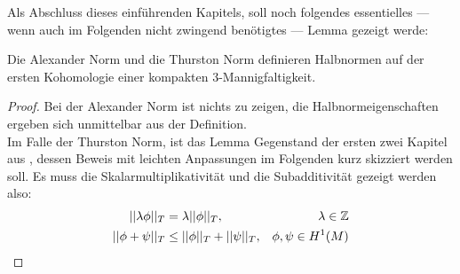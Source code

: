         Als Abschluss dieses einführenden Kapitels, soll noch folgendes essentielles --- wenn auch im Folgenden nicht zwingend benötigtes --- Lemma gezeigt werde:
        \begin{lem}
        \label{lem:norm}
        	Die Alexander Norm und die Thurston Norm definieren Halbnormen auf der ersten Kohomologie einer kompakten 3-Mannigfaltigkeit. 
        \end{lem}
        \begin{proof}
            Bei der Alexander Norm ist nichts zu zeigen, die Halbnormeigenschaften ergeben sich unmittelbar aus der Definition.\\
            Im Falle der Thurston Norm, ist das Lemma Gegenstand der ersten zwei Kapitel aus \cite{Thurston1986}, dessen Beweis mit leichten Anpassungen im Folgenden kurz skizziert werden soll.
            Es muss die Skalarmultiplikativität und die Subadditivität gezeigt werden also:
            \begin{align}
                ||\lambda\phi||_T & = \lambda ||\phi||_T ,&\lambda \in\mathbb{Z} \label{eq:scalarmul} \\
                ||\phi + \psi||_T &\leq ||\phi||_T + ||\psi||_T ,& \phi,\psi \in H^1(M) \label{eq:subadd}
            \end{align} 



\end{proof}
